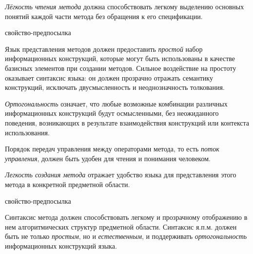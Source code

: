 \textit{Лёгкость чтения метода} должна способствовать легкому выделению основных понятий каждой части метода без обращения к его спецификации.

\begin{SCn}
\begin{scnrelfromlist}{свойство-предпосылка}
\end{scnrelfromlist}
\end{SCn}

Язык представления методов должен предоставить \textit{простой} набор информационных конструкций, которые могут быть использованы в качестве базисных элементов при создании методов.
Сильное воздействие на простоту оказывает синтаксис языка: он должен прозрачно отражать
семантику конструкций, исключать двусмысленность и неоднозначность толкования.

\textit{Ортогональность} означает, что любые возможные комбинации различных информационных конструкций будут осмысленными, без неожиданного поведения, возникающих в результате взаимодействия конструкций или контекста использования.

Порядок передач управления между операторами метода, то есть \textit{поток управления}, должен быть удобен для чтения и понимания человеком.

\textit{Легкость создания метода} отражает удобство языка для представления этого метода в конкретной предметной области.

\begin{SCn}
\begin{scnrelfromlist}{свойство-предпосылка}
\end{scnrelfromlist}
\end{SCn}

Синтаксис метода должен способствовать легкому и прозрачному отображению в нем алгоритмических структур предметной области. Синтаксис я.п.м. должен быть не только \textit{простым}, но и \textit{естественным}, и поддерживать \textit{ортогональность} информационных конструкций языка.

